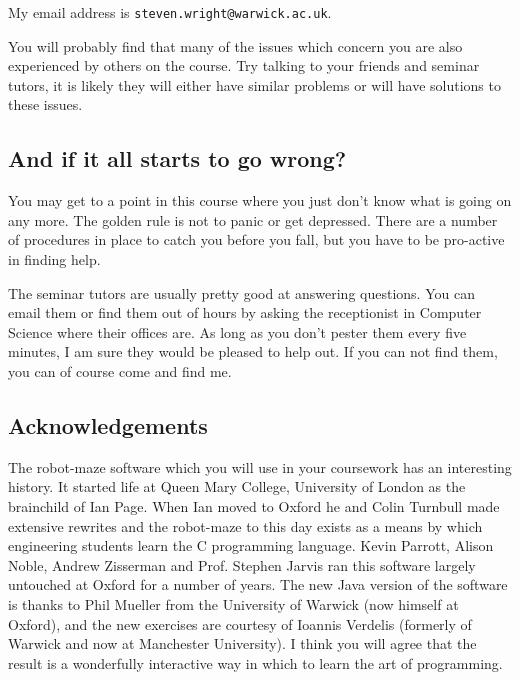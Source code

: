 My email address is 
{\tt steven.wright@warwick.ac.uk}. 
 
You will probably find that many of the issues which concern you are also
experienced by others on the course. Try talking to your friends and seminar
tutors, it is likely they will either have similar problems or will have solutions to
these issues.

\subsection{And if it all starts to go wrong?}

You may get to a point in this course where you just don't know what is going 
on any more. The golden rule is not to panic or get depressed. There are a number of procedures in place to
catch you before you fall, but you have to be pro-active in finding help.
 
The seminar tutors are usually pretty good at answering questions. You can 
email them or find them out of hours by asking the receptionist in Computer Science where 
their offices are. As long as you don't pester them every five minutes, I am
sure they would be pleased to help out. If you can not find them, you can of
course come and find me. 

\subsection{Acknowledgements}

The robot-maze software which you will use in your coursework has an 
interesting history. It started life at 
Queen Mary College, University of London as the brainchild of Ian Page. 
When Ian moved to Oxford he and Colin Turnbull made extensive rewrites and
the robot-maze to this day exists as a means by which engineering students
learn the C programming language. Kevin Parrott, Alison Noble, 
Andrew Zisserman and Prof. Stephen Jarvis ran this software largely untouched 
at Oxford for a number of years. The new Java version of the 
software is thanks to Phil Mueller from the University of Warwick (now 
himself at Oxford), and the new exercises are courtesy of Ioannis Verdelis
(formerly of Warwick and now at Manchester University). I think 
you will agree that the result is a 
wonderfully interactive way in which to learn the art of programming.
